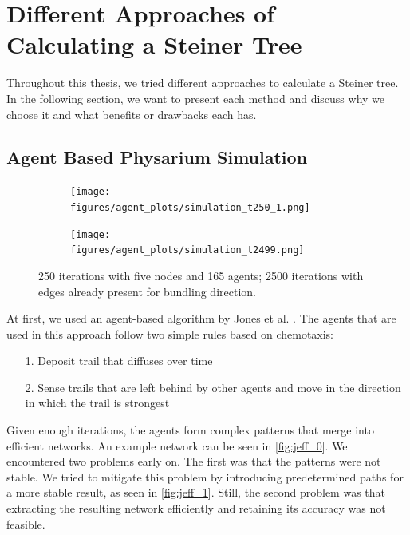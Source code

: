 \section{Different Approaches of Calculating a Steiner Tree}
\label{sec:different_approaches}

Throughout this thesis, we tried different approaches to calculate a Steiner tree. In the following section, we want to present each method and discuss why we choose it and what benefits or drawbacks each has.

\subsection{Agent Based Physarium Simulation}
\label{sec:agent-based_approach}

\begin{figure}[t]
    \centering
    \begin{subfigure}{0.45\linewidth}
        \centering
        \texttt{[image: figures/agent\_plots/simulation\_t250\_1.png]}
        \caption{}
        \label{fig:jeff_0}
    \end{subfigure}
    \begin{subfigure}{0.45\linewidth}
        \centering
        \texttt{[image: figures/agent\_plots/simulation\_t2499.png]}
        \caption{}
        \label{fig:jeff_1}
    \end{subfigure}
  \caption{ 250 iterations with five nodes and 165 agents;  2500 iterations with edges already present for bundling direction.}
  \label{fig:agent_plots}
\end{figure}

At first, we used an agent-based algorithm by Jones et al. \cite{jones_characteristics_2010}. The agents that are used in this approach follow two simple rules based on chemotaxis:

\begin{itemize}
    \item [1.] Deposit trail that diffuses over time
    \item [2.] Sense trails that are left behind by other agents and move in the direction in which the trail is strongest
\end{itemize}

Given enough iterations, the agents form complex patterns that merge into efficient networks. An example network can be seen in \autoref{fig:jeff_0}. We encountered two problems early on. The first was that the patterns were not stable. We tried to mitigate this problem by introducing predetermined paths for a more stable result, as seen in \autoref{fig:jeff_1}. Still, the second problem was that extracting the resulting network efficiently and retaining its accuracy was not feasible. 

